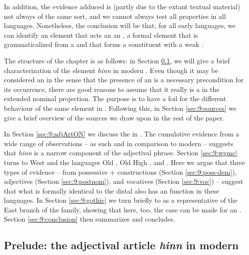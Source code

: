 \documentclass[output=paper,colorlinks,citecolor=brown]{langscibook}
\begin{document}
In addition, the evidence adduced is (partly due to the extant textual material) not always of the same sort, and we cannot always test all properties in all languages.  
Nonetheless, the conclusion will be that, for all early  languages, we can identify an element that acts an an ,  a formal element that is grammaticalized from a  and that forms a constituent with a weak .

The structure of the chapter is as follows: in Section \ref{sec:9:prelud}, we will give a brief characterization of the element \textit{hinn} in modern . Even though it may be considered an  in the sense that the presence of an  is a necessary precondition for its occurrence, there are good reasons to assume that it really is a  in the extended nominal projection. The purpose is to have a  foil for the different behaviour of the same element in . Following this, in Section \ref{sec:9:sources} we give a brief overview of the sources we draw upon in the rest of the paper.

In Section \ref{sec:9:adjArtON} we discuss the  in . The cumulative evidence from a wide range of observations -- as such and in comparison to modern  -- suggests that  \textit{hinn} is a narrow  component of the adjectival phrase. Section \ref{sec:9:wgmc} turns to West  and the languages Old , Old High , and . Here we argue that three types of evidence -- from possessive +  constructions (Section \ref{sec:9:poss-dem}),  adjectives (Section \ref{sec:9:postnom}), and vocatives (Section \ref{sec:9:voc}) -- suggest that what is formally identical to the distal  also has an  function in these languages. In Section \ref{sec:9:gothic} we turn briefly to  as a representative of the East  branch of the family, showing that here, too, the case can be made for an . Section \ref{sec:9:conclusion} then summarizes and concludes.



\subsection{Prelude: the adjectival article \textit{hinn} in modern } 
\label{sec:9:prelud}
\end{document}
